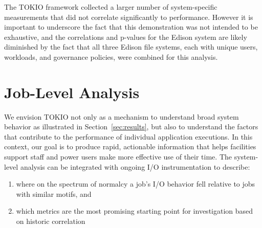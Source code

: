 The TOKIO framework collected a larger number of system-specific measurements that did not correlate significantly to performance.
However it is important to underscore the fact that this demonstration was not intended to be exhaustive, and the correlations and p-values for the Edison system are likely diminished by the fact that all three Edison file systems, each with unique users, workloads, and governance policies, were combined for this analysis.

\section{Job-Level Analysis} \label{sec:results/umami}

We envision TOKIO not only as a mechanism to understand broad system behavior as illustrated in Section~\ref{sec:results}, but also to understand the factors that contribute to the performance of individual application executions.
In this context, our goal is to produce rapid, actionable information that helps facilities support staff and power users make more effective use of their time.
The system-level analysis can be integrated with ongoing I/O instrumentation to describe:

\begin{enumerate}
\item where on the spectrum of normalcy a job's I/O behavior fell relative to
jobs with similar motifs, and
\item which metrics are the most promising starting point for
investigation based on historic correlation
\end{enumerate}

